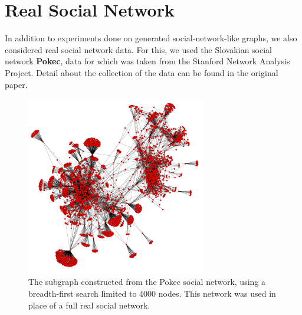 \documentclass[bsc,frontabs,twoside,singlespacing,parskip,deptreport]{infthesis}     %
\begin{document}
\section{Real Social Network} \label{sec:real_social_network}
In addition to experiments done on generated social-network-like graphs, we also considered real social network data. For this, we used the Slovakian social network \textbf{Pokec}, data for which was taken from the Stanford Network Analysis Project\cite{snapnets}. Detail about the collection of the data can be found in the original paper\cite{pokecsource}.

\begin{figure}
  \centering
    \includegraphics[width=0.7\textwidth]{pokec_4000}
  \caption{The subgraph constructed from the Pokec social network, using a breadth-first search limited to 4000 nodes. This network was used in place of a full real social network.}
  \label{fig:pokec_4000}
\end{figure}
\end{document}
